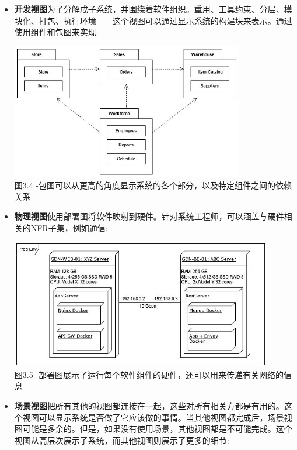 \begin{itemize}
\item 
\textbf{开发视图}为了分解成子系统，并围绕着软件组织。重用、工具约束、分层、模块化、打包、执行环境——这个视图可以通过显示系统的构建块来表示。通过使用组件和包图来实现:

\begin{center}
\includegraphics[width=0.8\textwidth]{content/1/chapter3/images/4.jpg}\\
图3.4 -包图可以从更高的角度显示系统的各个部分，以及特定组件之间的依赖关系
\end{center}

\item
\textbf{物理视图}使用部署图将软件映射到硬件。针对系统工程师，可以涵盖与硬件相关的NFR子集，例如通信:

\begin{center}
\includegraphics[width=0.9\textwidth]{content/1/chapter3/images/5.jpg}\\
图3.5 -部署图展示了运行每个软件组件的硬件，还可以用来传递有关网络的信息
\end{center}

\item
\textbf{场景视图}把所有其他的视图都连接在一起，这些对所有相关方都是有用的。这个视图可以显示系统是否做了它应该做的事情。当其他视图都完成后，场景视图可能是多余的。但是，如果没有使用场景，其他视图都是不可能完成。这个视图从高层次展示了系统，而其他视图则展示了更多的细节:


\end{itemize}
